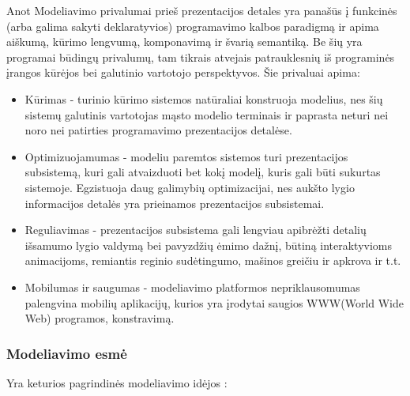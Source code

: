 Anot \cite{ElliottHudak97:Fran} Modeliavimo privalumai prieš prezentacijos detales yra panašūs į funkcinės (arba galima sakyti deklaratyvios) programavimo kalbos paradigmą ir apima aiškumą, kūrimo lengvumą, komponavimą ir švarią semantiką. Be šių yra programai būdingų privalumų, tam tikrais atvejais patrauklesnių iš programinės įrangos kūrėjos bei galutinio vartotojo perspektyvos. Šie privaluai apima:

\begin{itemize}

	\item Kūrimas - turinio kūrimo sistemos natūraliai konstruoja modelius, nes šių sistemų galutinis vartotojas mąsto modelio terminais ir paprasta neturi nei noro nei patirties programavimo prezentacijos detalėse.

	\item Optimizuojamumas - modeliu paremtos sistemos turi prezentacijos subsistemą, kuri gali atvaizduoti bet kokį modelį, kuris gali būti sukurtas sistemoje. Egzistuoja daug galimybių optimizacijai, nes aukšto lygio informacijos detalės yra prieinamos prezentacijos subsistemai.

	\item Reguliavimas - prezentacijos subsistema gali lengviau apibrėžti detalių išsamumo lygio valdymą bei pavyzdžių ėmimo dažnį, būtiną interaktyvioms animacijoms, remiantis reginio sudėtingumo, mašinos greičiu ir apkrova ir t.t.

	\item Mobilumas ir saugumas - modeliavimo platformos nepriklausomumas palengvina mobilių aplikacijų, kurios yra įrodytai saugios WWW(World Wide Web) programos, konstravimą.

\end{itemize}

\subsubsection{Modeliavimo esmė}

Yra keturios pagrindinės modeliavimo idėjos \cite{ElliottHudak97:Fran}:

